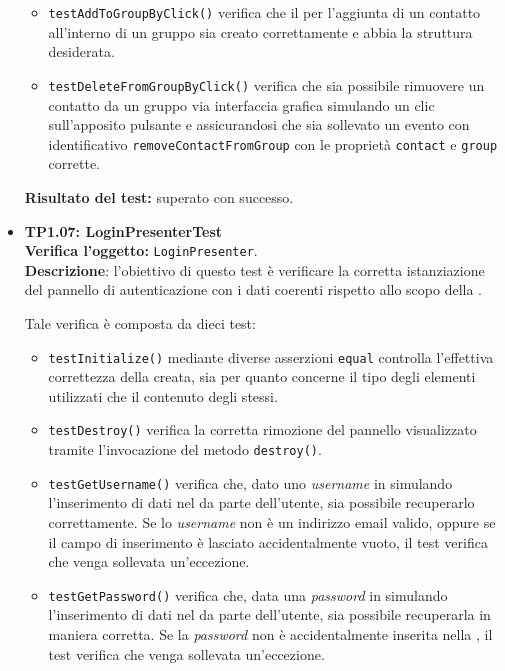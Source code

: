 \begin{itemize}
\begin{itemize}
\item \texttt{testAddToGroupByClick()} verifica che il  per l'aggiunta di un contatto all'interno di un gruppo sia creato correttamente e abbia la struttura desiderata.

\item \texttt{testDeleteFromGroupByClick()} verifica che sia possibile rimuovere un contatto da un gruppo via interfaccia grafica simulando un clic sull'apposito pulsante e assicurandosi che sia sollevato un evento con identificativo \verb'removeContactFromGroup' con le proprietà \verb'contact' e \verb'group' corrette.

\end{itemize}
\textbf{Risultato del test:} superato con successo.

\item[\passed] \textbf{TP1.07: LoginPresenterTest}\\
\textbf{Verifica l'oggetto:} \texttt{LoginPresenter}.\\
\textbf{Descrizione}: l'obiettivo di questo test è verificare la corretta istanziazione del pannello di autenticazione con i dati coerenti rispetto allo scopo della .

Tale verifica è composta da dieci test:
\begin{itemize} 

\item \texttt{testInitialize()} mediante diverse asserzioni \texttt{equal} controlla l'effettiva correttezza della  creata, sia per quanto concerne il tipo degli elementi utilizzati che il contenuto degli stessi.

\item \texttt{testDestroy()} verifica la corretta rimozione del pannello visualizzato tramite l'invocazione del metodo \verb'destroy()'.

\item \texttt{testGetUsername()} verifica che, dato uno \textit{username} in  simulando l'inserimento di dati nel  da parte dell'utente, sia possibile recuperarlo correttamente. Se lo \textit{username} non è un indirizzo email valido, oppure se il campo di inserimento è lasciato accidentalmente vuoto, il test verifica che venga sollevata un'eccezione.

\item \texttt{testGetPassword()} verifica che, data una \textit{password} in  simulando l'inserimento di dati nel  da parte dell'utente, sia possibile recuperarla in maniera corretta. Se la \textit{password} non è accidentalmente inserita nella , il test verifica che venga sollevata un'eccezione.


\end{itemize}
\end{itemize}
